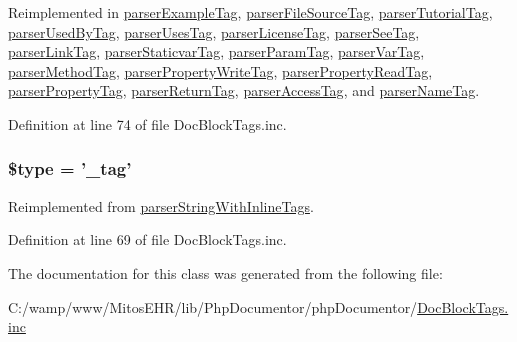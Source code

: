 \-Reimplemented in \hyperlink{classparser_example_tag_a4a925d6b38bcf3957c713a7d3dc7da1f}{parser\-Example\-Tag}, \hyperlink{classparser_file_source_tag_a4a925d6b38bcf3957c713a7d3dc7da1f}{parser\-File\-Source\-Tag}, \hyperlink{classparser_tutorial_tag_a4a925d6b38bcf3957c713a7d3dc7da1f}{parser\-Tutorial\-Tag}, \hyperlink{classparser_used_by_tag_a4a925d6b38bcf3957c713a7d3dc7da1f}{parser\-Used\-By\-Tag}, \hyperlink{classparser_uses_tag_a4a925d6b38bcf3957c713a7d3dc7da1f}{parser\-Uses\-Tag}, \hyperlink{classparser_license_tag_a4a925d6b38bcf3957c713a7d3dc7da1f}{parser\-License\-Tag}, \hyperlink{classparser_see_tag_a4a925d6b38bcf3957c713a7d3dc7da1f}{parser\-See\-Tag}, \hyperlink{classparser_link_tag_a4a925d6b38bcf3957c713a7d3dc7da1f}{parser\-Link\-Tag}, \hyperlink{classparser_staticvar_tag_a4a925d6b38bcf3957c713a7d3dc7da1f}{parser\-Staticvar\-Tag}, \hyperlink{classparser_param_tag_a4a925d6b38bcf3957c713a7d3dc7da1f}{parser\-Param\-Tag}, \hyperlink{classparser_var_tag_a4a925d6b38bcf3957c713a7d3dc7da1f}{parser\-Var\-Tag}, \hyperlink{classparser_method_tag_a4a925d6b38bcf3957c713a7d3dc7da1f}{parser\-Method\-Tag}, \hyperlink{classparser_property_write_tag_a4a925d6b38bcf3957c713a7d3dc7da1f}{parser\-Property\-Write\-Tag}, \hyperlink{classparser_property_read_tag_a4a925d6b38bcf3957c713a7d3dc7da1f}{parser\-Property\-Read\-Tag}, \hyperlink{classparser_property_tag_a4a925d6b38bcf3957c713a7d3dc7da1f}{parser\-Property\-Tag}, \hyperlink{classparser_return_tag_a4a925d6b38bcf3957c713a7d3dc7da1f}{parser\-Return\-Tag}, \hyperlink{classparser_access_tag_a4a925d6b38bcf3957c713a7d3dc7da1f}{parser\-Access\-Tag}, and \hyperlink{classparser_name_tag_a4a925d6b38bcf3957c713a7d3dc7da1f}{parser\-Name\-Tag}.



\-Definition at line 74 of file \-Doc\-Block\-Tags.\-inc.

\hypertarget{classparser_tag_a9a4a6fba2208984cabb3afacadf33919}{
\subsubsection[{\$type}]{\setlength{\rightskip}{0pt plus 5cm}\$type = '\-\_\-tag'}}\label{classparser_tag_a9a4a6fba2208984cabb3afacadf33919}


\-Reimplemented from \hyperlink{classparser_string_with_inline_tags_a9a4a6fba2208984cabb3afacadf33919}{parser\-String\-With\-Inline\-Tags}.



\-Definition at line 69 of file \-Doc\-Block\-Tags.\-inc.



\-The documentation for this class was generated from the following file\-:\begin{DoxyCompactItemize}
\item 
\-C\-:/wamp/www/\-Mitos\-E\-H\-R/lib/\-Php\-Documentor/php\-Documentor/\hyperlink{_doc_block_tags_8inc}{\-Doc\-Block\-Tags.\-inc}\end{DoxyCompactItemize}
